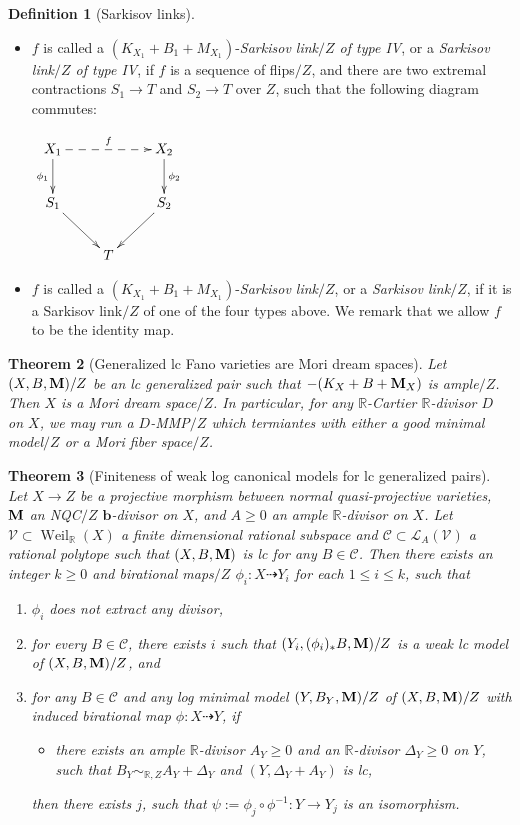 \documentclass[11pt]{amsart}
\numberwithin{equation}{section}
\newcommand{\bb}{\bm{b}}
\newcommand{\Mm}{{\bf{M}}}
\newcommand{\Rr}{\mathbb{R}}
\newcommand{\Weil}{\operatorname{Weil}}
\newtheorem{thm}{Theorem}[section]
\theoremstyle{definition}
\newtheorem{defn}[thm]{Definition}
\theoremstyle{definition}
\theoremstyle{definition}
\begin{document}
\begin{defn}[Sarkisov links]
\begin{itemize}
\item $f$ is called a $(K_{X_1}+B_1+M_{X_1})$-\emph{Sarkisov link$/Z$ of type IV}, or a \emph{Sarkisov link$/Z$ of type IV}, if $f$ is a sequence of flips$/Z$, and there are two extremal contractions $S_1\rightarrow T$ and $S_2\rightarrow T$ over $Z$, such that the following diagram commutes:
\begin{center}$\xymatrix{
 X_1\ar@{-->}[rr]^{f}\ar@{->}[d]_{\phi_1}& &X_2\ar@{->}[d]^{\phi_2} \\
      S_1\ar@{->}[dr]   &  & S_2\ar@{->}[dl] \\
    & T&}$
\end{center}
\item $f$ is called a  $(K_{X_1}+B_1+M_{X_1})$-\emph{Sarkisov link}$/Z$, or a \emph{Sarkisov link}$/Z$, if it is a Sarkisov link$/Z$ of one of the four types above. We remark that we allow $f$ to be the identity map.
\end{itemize}
\end{defn}


\begin{thm}[Generalized lc Fano varieties are Mori dream spaces]
    Let $(X,B,\Mm)/Z$ be an lc generalized pair such that $-(K_X+B+\Mm_X)$ is ample$/Z$. Then $X$ is a Mori dream space$/Z$. In particular, for any $\Rr$-Cartier $\Rr$-divisor $D$ on $X$, we may run a $D$-MMP$/Z$ which termiantes with either a good minimal model$/Z$ or a Mori fiber space$/Z$.
\end{thm}


\begin{thm}[Finiteness of weak log canonical models for lc generalized pairs]\label{thm: finiteness ltm lc gpair}
Let $X\rightarrow Z$ be a projective morphism between normal quasi-projective varieties, $\Mm$ an NQC$/Z$ $\bb$-divisor on $X$, and $A\geq 0$ an ample $\Rr$-divisor on $X$. Let  $\mathcal{V}\subset\Weil_{\Rr}(X)$ a finite dimensional rational subspace and $\mathcal{C}\subset\mathcal{L}_A(\mathcal{V})$ a rational polytope such that $(X,B,\Mm)$ is lc for any $B\in\mathcal{C}$. Then there exists an integer $k\geq 0$ and birational maps$/Z$ $\phi_i: X\dashrightarrow Y_i$ for each $1\leq i\leq k$, such that 
\begin{enumerate}
    \item $\phi_i$ does not extract any divisor, 
    \item for every $B\in\mathcal{C}$, there exists $i$ such that $(Y_i,(\phi_i)_*B,\Mm)/Z$ is a weak lc model of $(X,B,\Mm)/Z$, and
    \item for any $B\in\mathcal{C}$ and any log minimal model $(Y,B_Y,\Mm)/Z$ of $(X,B,\Mm)/Z$ with induced birational map $\phi: X\dashrightarrow Y$, if 
    \begin{itemize}
        \item there exists an ample $\Rr$-divisor $A_Y\geq 0$ and an $\Rr$-divisor $\Delta_Y\geq 0$ on $Y$, such that $B_Y\sim_{\mathbb R,Z}A_Y+\Delta_Y$ and $(Y,\Delta_Y+A_Y)$ is lc,
    \end{itemize}
    then there exists $j$, such that  $\psi:=\phi_j\circ\phi^{-1}: Y\rightarrow Y_j$ is an isomorphism.
\end{enumerate}
\end{thm}
\end{document}
